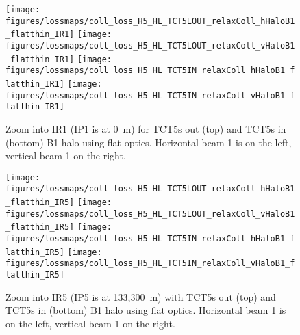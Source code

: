 \begin{figure}
\begin{center}
\vskip-12mm
\texttt{[image: figures/lossmaps/coll\_loss\_H5\_HL\_TCT5LOUT\_relaxColl\_hHaloB1\_flatthin\_IR1]}
\texttt{[image: figures/lossmaps/coll\_loss\_H5\_HL\_TCT5LOUT\_relaxColl\_vHaloB1\_flatthin\_IR1]}
\texttt{[image: figures/lossmaps/coll\_loss\_H5\_HL\_TCT5IN\_relaxColl\_hHaloB1\_flatthin\_IR1]}
\texttt{[image: figures/lossmaps/coll\_loss\_H5\_HL\_TCT5IN\_relaxColl\_vHaloB1\_flatthin\_IR1]}
\end{center}
\vspace{-0.3cm}
 \caption{Zoom into IR1 (IP1 is at 0~m) for TCT5s out (top) and TCT5s in (bottom) B1 halo using flat optics. Horizontal beam 1 is on the left, vertical beam 1 on the right.
  \label{IR1_flatB1}}
\end{figure}


\begin{figure}
\begin{center}
\vskip-12mm
\texttt{[image: figures/lossmaps/coll\_loss\_H5\_HL\_TCT5LOUT\_relaxColl\_hHaloB1\_flatthin\_IR5]}
\texttt{[image: figures/lossmaps/coll\_loss\_H5\_HL\_TCT5LOUT\_relaxColl\_vHaloB1\_flatthin\_IR5]}
\texttt{[image: figures/lossmaps/coll\_loss\_H5\_HL\_TCT5IN\_relaxColl\_hHaloB1\_flatthin\_IR5]}
\texttt{[image: figures/lossmaps/coll\_loss\_H5\_HL\_TCT5IN\_relaxColl\_vHaloB1\_flatthin\_IR5]}
\end{center}
\vspace{-0.3cm}
 \caption{Zoom into IR5 (IP5 is at 133,300~m) with TCT5s out (top) and TCT5s in (bottom) B1 halo using flat optics. Horizontal beam 1 is on the left, vertical beam 1 on the right.
  \label{IR5_flatB1}}
\end{figure}
